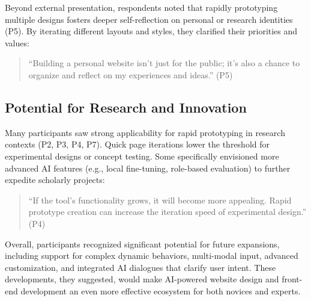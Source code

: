 Beyond external presentation, respondents noted that rapidly prototyping multiple designs fosters deeper self-reflection on personal or research identities (P5). By iterating different layouts and styles, they clarified their priorities and values:

\begin{quote}
``Building a personal website isn't just for the public; it's also a chance to organize and reflect on my experiences and ideas.'' (P5)
\end{quote}

\subsection{Potential for Research and Innovation}
Many participants saw strong applicability for rapid prototyping in research contexts (P2, P3, P4, P7). Quick page iterations lower the threshold for experimental designs or concept testing. Some specifically envisioned more advanced AI features (e.g., local fine-tuning, role-based evaluation) to further expedite scholarly projects:

\begin{quote}
``If the tool's functionality grows, it will become more appealing. Rapid prototype creation can increase the iteration speed of experimental design.'' (P4)
\end{quote}

Overall, participants recognized significant potential for future expansions, including support for complex dynamic behaviors, multi-modal input, advanced customization, and integrated AI dialogues that clarify user intent. These developments, they suggested, would make AI-powered website design and front-end development an even more effective ecosystem for both novices and experts.